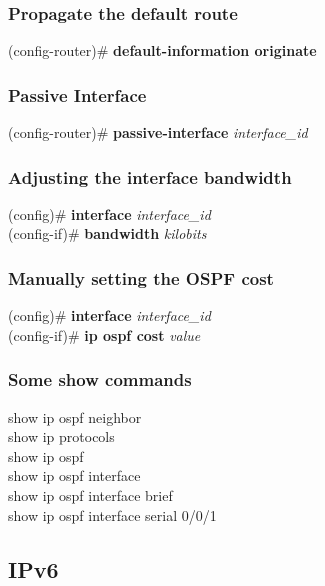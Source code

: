 \subsubsection*{Propagate the default route}
(config-router)\# \textbf{default-information originate}
\subsubsection*{Passive Interface}
(config-router)\#\textbf{ passive-interface} \textit{interface\_id}
\subsubsection*{Adjusting the interface bandwidth}
(config)\# \textbf{interface} \textit{interface\_id}\\
(config-if)\# \textbf{bandwidth} \textit{kilobits}
\subsubsection*{Manually setting the OSPF cost}
(config)\# \textbf{interface} \textit{interface\_id}\\
(config-if)\# \textbf{ip ospf cost} \textit{value}
\subsubsection*{Some show commands}
show ip ospf neighbor\\
show ip protocols\\
show ip ospf\\
show ip ospf interface\\
show ip ospf interface brief\\
show ip ospf interface serial 0/0/1

\subsection{IPv6}
